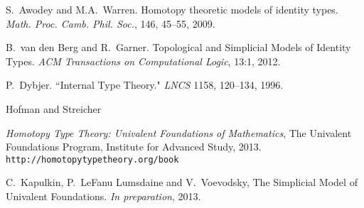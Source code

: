 \documentclass[11pt]{article}
\theoremstyle{remark}
\theoremstyle{definition}
\begin{document}
\begin{thebibliography}{300}

S.~Awodey and M.A.~Warren. Homotopy theoretic models of identity types. \emph{Math. Proc. Camb. Phil. Soc.}, 146, 45--55, 2009.

B.~van den Berg and R.~Garner. Topological and Simplicial Models of Identity Types. \emph{ACM Transactions on Computational Logic}, 13:1, 2012.

P.~Dybjer. ``Internal Type Theory." \emph{LNCS} 1158, 120--134, 1996.

 Hofman and Streicher 

\emph{Homotopy Type Theory: Univalent Foundations of Mathematics}, The Univalent Foundations Program, Institute for Advanced Study, 2013. {\tt http://homotopytypetheory.org/book}

C.~Kapulkin, P.~LeFanu Lumsdaine and V.~Voevodsky, The Simplicial Model of Univalent Foundations. \emph{In preparation}, 2013.

%
\end{thebibliography}

\end{document}
